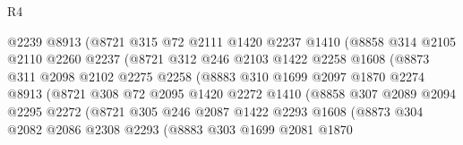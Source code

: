 \begin{lexlean}{R4}
\begin{coremodule}
                        @2239
                        @8913
                        (@8721
                          @315
                          @72
                          @2111
                          @1420
                          @2237
                          @1410
                          (@8858
                            @314
                            @2105
                            @2110
                            @2260
                            @2237
                            (@8721
                              @312
                              @246
                              @2103
                              @1422
                              @2258
                              @1608
                              (@8873
                                @311
                                @2098
                                @2102
                                @2275
                                @2258
                                (@8883
                                  @310
                                  @1699
                                  @2097
                                  @1870
                                  @2274
                                  @8913
                                  (@8721
                                    @308
                                    @72
                                    @2095
                                    @1420
                                    @2272
                                    @1410
                                    (@8858
                                      @307
                                      @2089
                                      @2094
                                      @2295
                                      @2272
                                      (@8721
                                        @305
                                        @246
                                        @2087
                                        @1422
                                        @2293
                                        @1608
                                        (@8873
                                          @304
                                          @2082
                                          @2086
                                          @2308
                                          @2293
                                          (@8883
                                            @303
                                            @1699
                                            @2081
                                            @1870

\end{coremodule}
\end{lexlean}
